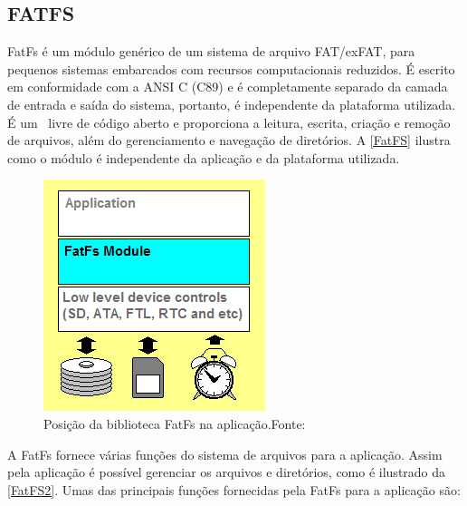 \subsection{FATFS}

FatFs é um módulo genérico de um sistema de arquivo FAT/exFAT, para pequenos sistemas embarcados com recursos computacionais reduzidos. É escrito em conformidade com a ANSI C (C89) e é completamente separado da camada de entrada e saída do sistema, portanto, é independente da plataforma utilizada. É um \software\ livre de código aberto e proporciona a leitura, escrita, criação e remoção de arquivos, além do gerenciamento e navegação de diretórios. A \autoref{FatFS} ilustra como o módulo é independente da aplicação e da plataforma utilizada.

\begin{figure}[H]
    \scriptsize
     \centering
     \includegraphics[scale=0.6]{dados/figuras/fatfs.png}
     \caption{Posição da biblioteca FatFs na aplicação.\newline  Fonte:\cite{FATFS}}
     \label{FatFS}
\end{figure}
A FatFs fornece várias funções do sistema de arquivos para a aplicação.
Assim pela aplicação é possível gerenciar os arquivos e diretórios, como é ilustrado da \autoref{FatFS2}. Umas das principais funções fornecidas pela FatFs para a aplicação são:


